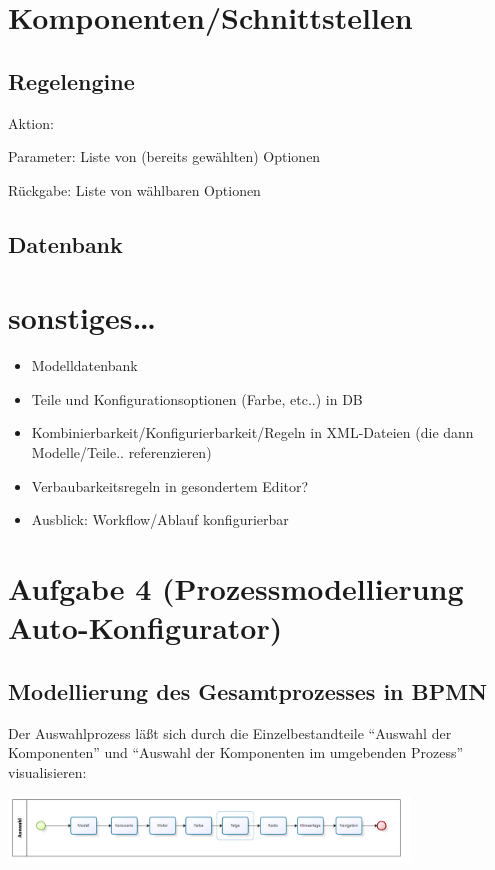 \documentclass[a4paper,10pt]{article}
\begin{document}
\section{Komponenten/Schnittstellen}

\subsection*{Regelengine}

Aktion:
 

Parameter:
 Liste von (bereits gewählten) Optionen

Rückgabe:
 Liste von wählbaren Optionen

\subsection*{Datenbank}


\section{sonstiges\ldots}
\begin{itemize}
 \item Modelldatenbank
 \item Teile und Konfigurationsoptionen (Farbe, etc..) in DB
 \item Kombinierbarkeit/Konfigurierbarkeit/Regeln in XML-Dateien (die dann Modelle/Teile.. referenzieren)
 \item Verbaubarkeitsregeln in gesondertem Editor?
 \item Ausblick: Workflow/Ablauf konfigurierbar
\end{itemize}

\section{Aufgabe 4 (Prozessmodellierung Auto-Konfigurator)}
 
\subsection*{Modellierung des Gesamtprozesses in BPMN}

Der Auswahlprozess läßt sich durch die Einzelbestandteile ``Auswahl der
Komponenten'' und ``Auswahl der Komponenten im umgebenden Prozess''
visualisieren:\newline
 
\includegraphics[width=0.8\textwidth]{screenshots/auswahl.png}
\end{document}
